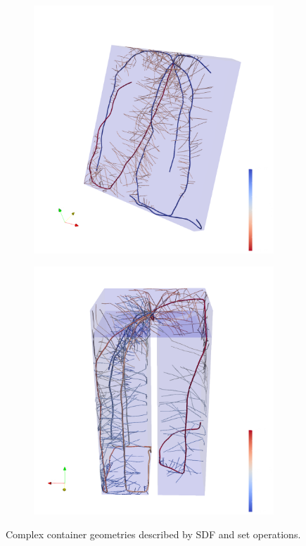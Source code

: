 \begin{figure}
\begin{subfigure}[c]{0.49\textwidth}
\includegraphics[width=0.99\textwidth]{figures/topics_virtual2_a.png} 
 \label{fig:topics_virtual2_a}
\end{subfigure}
\begin{subfigure}[c]{0.49\textwidth}
\includegraphics[width=0.99\textwidth]{figures/topics_virtual2_b.png} 
 \label{fig:topics_virtual2_b}
\end{subfigure}
\caption{Complex container geometries described by SDF and set operations.}
\end{figure}

